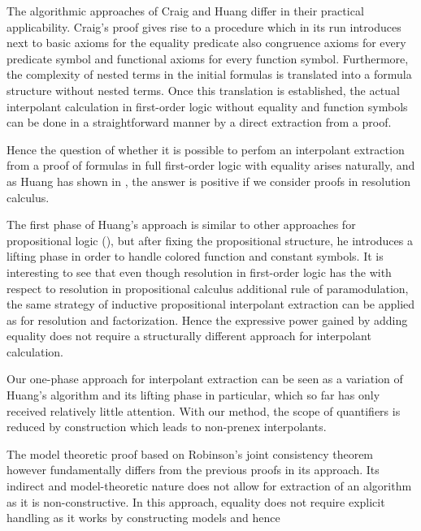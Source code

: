 The algorithmic approaches of Craig and Huang differ in their practical applicability. 
Craig's proof  gives rise to a procedure which in its run introduces next to basic axioms for the equality predicate also congruence axioms for every predicate symbol and functional axioms for every function symbol.
Furthermore, the complexity of nested terms in the initial formulas is translated into a formula structure without nested terms.
Once this translation is established, the actual interpolant calculation in first-order logic without equality and function symbols can be done in a straightforward manner by a direct extraction from a proof.

Hence the question of whether it is possible to perfom an interpolant extraction from a proof of formulas in full first-order logic with equality arises naturally, and as Huang has shown in \cite{Huang95}, the answer is positive if we consider proofs in resolution calculus.

The first phase of Huang's approach is similar to other approaches for propositional logic (\cite{krajivcek1997interpolation,Pudlak97,McMillan03}),
but after fixing the propositional structure, he introduces a lifting phase in order to handle colored function and constant symbols.
It is interesting to see that even though resolution in first-order logic has the with respect to resolution in propositional calculus additional rule of paramodulation, the same strategy of inductive propositional interpolant extraction can be applied as for resolution and factorization.
Hence the expressive power gained by adding equality does not require a structurally different approach for interpolant calculation.


Our one-phase approach for interpolant extraction can be seen as a variation of Huang's algorithm and its lifting phase in particular, which so far has only received relatively little attention.
With our method, the scope of quantifiers is reduced by construction which leads to non-prenex interpolants.



The model theoretic proof based on Robinson's joint consistency theorem however fundamentally differs from the previous proofs in its approach.
Its indirect and model-theoretic nature does not allow for extraction of an algorithm as it is non-constructive. 
In this approach, equality does not require explicit handling as it works by constructing models and hence 











%
%
%
%
%



